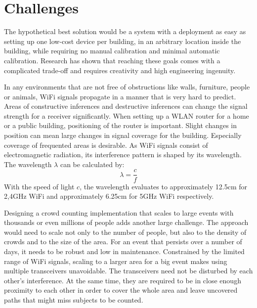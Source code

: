 \documentclass[conference]{IEEEtran}
\begin{document}
\section{Challenges}
The hypothetical best solution would be a system with a deployment as easy as setting up one low-cost device per building, in an arbitrary location inside the building, while requiring no manual calibration and minimal automatic calibration. Research has shown that reaching these goals comes with a complicated trade-off and requires creativity and high engineering ingenuity. 
\par
In any environments that are not free of obstructions like walls, furniture, people or animals, WiFi signals propagate in a manner that is very hard to predict. Areas of constructive inferences and destructive inferences can change the signal strength for a receiver significantly. When setting up a WLAN router for a home or a public building, positioning of the router is important. Slight changes in position can mean large changes in signal coverage for the building. Especially coverage of frequented areas is desirable. As WiFi signals consist of electromagnetic radiation, its interference pattern is shaped by its wavelength. The wavelength $\lambda$ can be calculated by: $$\lambda = \frac{c}{f}$$ With the speed of light $c$, the wavelength evaluates to approximately 12.5cm for 2,4GHz WiFi and approximately 6.25cm for 5GHz WiFi respectively.
\par
Designing a crowd counting implementation that scales to large events with thousands or even millions of people adds another large challenge. The approach would need to scale not only to the number of people, but also to the density of crowds and to the size of the area. For an event that persists over a number of days, it needs to be robust and low in maintenance. Constrained by the limited range of WiFi signals, scaling to a larger area for a big event makes using multiple transceivers unavoidable. The transceivers need not be disturbed by each other's interference. At the same time, they are required to be in close enough proximity to each other in order to cover the whole area and leave uncovered paths that might miss subjects to be counted.
\end{document}

